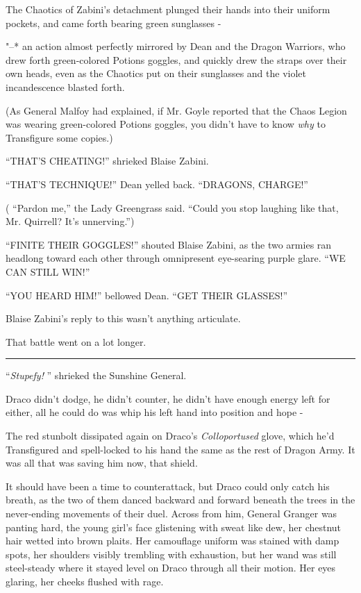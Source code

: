 The Chaotics of Zabini's detachment plunged their hands into their
uniform pockets, and came forth bearing green sunglasses -

"--* an action almost perfectly mirrored by Dean and the Dragon Warriors,
who drew forth green-colored Potions goggles, and quickly drew the
straps over their own heads, even as the Chaotics put on their
sunglasses and the violet incandescence blasted forth.

(As General Malfoy had explained, if Mr. Goyle reported that the Chaos
Legion was wearing green-colored Potions goggles, you didn't have to
know \emph{why} to Transfigure some copies.)

``THAT'S CHEATING!'' shrieked Blaise Zabini.

``THAT'S TECHNIQUE!'' Dean yelled back. ``DRAGONS, CHARGE!''

( ``Pardon me,'' the Lady Greengrass said. ``Could you stop laughing
like that, Mr. Quirrell? It's unnerving.'')

``FINITE THEIR GOGGLES!'' shouted Blaise Zabini, as the two armies ran
headlong toward each other through omnipresent eye-searing purple glare.
``WE CAN STILL WIN!''

``YOU HEARD HIM!'' bellowed Dean. ``GET THEIR GLASSES!''

Blaise Zabini's reply to this wasn't anything articulate.

That battle went on a lot longer.

\begin{center}\rule{3in}{0.4pt}\end{center}

``\emph{Stupefy!} '' shrieked the Sunshine General.

Draco didn't dodge, he didn't counter, he didn't have enough energy left
for either, all he could do was whip his left hand into position and
hope -

The red stunbolt dissipated again on Draco's \emph{Colloportused} glove,
which he'd Transfigured and spell-locked to his hand the same as the
rest of Dragon Army. It was all that was saving him now, that shield.

It should have been a time to counterattack, but Draco could only catch
his breath, as the two of them danced backward and forward beneath the
trees in the never-ending movements of their duel. Across from him,
General Granger was panting hard, the young girl's face glistening with
sweat like dew, her chestnut hair wetted into brown plaits. Her
camouflage uniform was stained with damp spots, her shoulders visibly
trembling with exhaustion, but her wand was still steel-steady where it
stayed level on Draco through all their motion. Her eyes glaring, her
cheeks flushed with rage.

